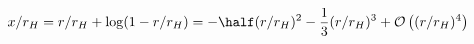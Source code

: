\begin{equation}
x/r_H = r/r_H + \log (1-r/r_H) = -\half(r/r_H)^2 - \frac{1}{3}(r/r_H)^3 + {\mathcal O}\left((r/r_H)^4\right)
\end{equation}


